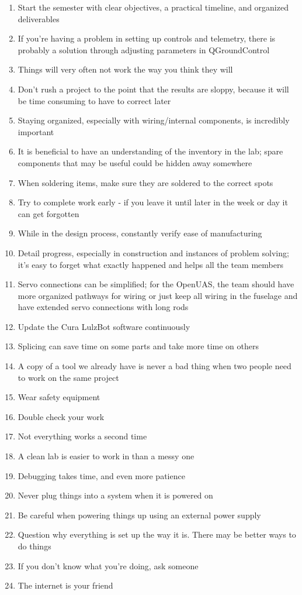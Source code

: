 \documentclass{article}
\begin{document}
\begin{enumerate}
\item Start the semester with clear objectives, a practical timeline, and organized deliverables
\item If you're having a problem in setting up controls and telemetry, there is probably a solution through adjusting parameters in QGroundControl
\item Things will very often not work the way you think they will
\item Don't rush a project to the point that the results are sloppy, because it will be time consuming to have to correct later
\item Staying organized, especially with wiring/internal components, is incredibly important
\item It is beneficial to have an understanding of the inventory in the lab; spare components that may be useful could be hidden away somewhere
\item When soldering items, make sure they are soldered to the correct spots
\item Try to complete work early - if you leave it until later in the week or day it can get forgotten
\item While in the design process, constantly verify ease of manufacturing
\item Detail progress, especially in construction and instances of problem solving; it's easy to forget what exactly happened and helps all the team members
\item Servo connections can be simplified; for the OpenUAS, the team should have more organized pathways for wiring or just keep all wiring in the fuselage and have extended servo connections with long rods
\item Update the Cura LulzBot software continuously
\item Splicing can save time on some parts and take more time on others
\item A copy of a tool we already have is never a bad thing when two people need to work on the same project
\item Wear safety equipment 
\item Double check your work
\item Not everything works a second time
\item A clean lab is easier to work in than a messy one
\item Debugging takes time, and even more patience 
\item Never plug things into a system when it is powered on
\item Be careful when powering things up using an external power supply
\item Question why everything is set up the way it is. There may be better ways to do things
\item If you don't know what you're doing, ask someone
\item The internet is your friend
\end{enumerate}
\end{document}
